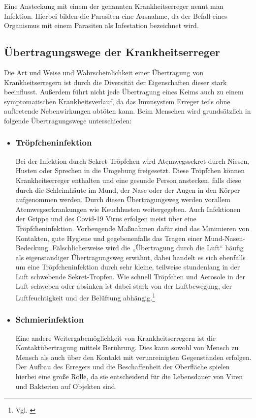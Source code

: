 \documentclass[12pt]{article}
\begin{document}
Eine Ansteckung mit einem der genannten Krankheitserreger nennt man Infektion. Hierbei bilden die Parasiten eine Ausnahme, da der Befall eines Organismus mit einem Parasiten als Infestation bezeichnet wird.

\subsection{Übertragungswege der Krankheitserreger}
Die Art und Weise und Wahrscheinlichkeit einer Übertragung von Krankheitserregern ist durch die Diversität der Eigenschaften dieser stark beeinflusst. Außerdem führt nicht jede Übertragung eines Keims auch zu einem symptomatischen Krankheitsverlauf, da das Imunsystem Erreger teils ohne auftretende Nebenwirkungen abtöten kann. Beim Menschen wird grundsätzlich in folgende Übertragungswege unterschieden:
\begin{itemize}
    \item \subsubsection{Tröpfcheninfektion}
    Bei der Infektion durch Sekret-Tröpfchen wird Atemwegssekret durch Niesen, Husten oder Sprechen in die Umgebung freigesetzt. Diese Tröpfchen können Krankheitserreger enthalten und eine gesunde Person anstecken, falls diese durch die Schleimhäute im  Mund, der Nase oder der Augen in den Körper aufgenommen werden. Durch diesen Übertragungsweg werden vorallem Atemwegserkrankungen wie Keuchhusten weitergegeben. Auch Infektionen der Grippe und des Covid-19 Virus erfolgen meist über eine Tröpfcheninfektion. Vorbeugende Maßnahmen dafür sind das Minimieren von Kontakten, gute Hygiene und gegebenenfalls das Tragen einer Mund-Nasen-Bedeckung.
    Fälschlicherweise wird die „Übertragung durch die Luft“ häufig als eigenständiger Übertragungsweg erwähnt, dabei handelt es sich ebenfalls um eine Tröpfcheninfektion durch sehr kleine, teilweise stundenlang in der Luft schwebende Sekret-Tropfen. Wie schnell Tröpfchen und Aerosole in der Luft schweben oder absinken ist dabei stark von der Luftbewegung, der Luftfeuchtigkeit und der Belüftung abhängig.\footnote{Vgl. \cite{Rki21}}
    \item \subsubsection{Schmierinfektion}
    Eine andere Weitergabemöglichkeit von Krankheitserregern ist die Kontaktübertragung mittels Berührung. Dies kann sowohl von Mensch zu Mensch als auch über den Kontakt mit verunreinigten Gegenständen erfolgen. Der Aufbau des Erregers und die Beschaffenheit der Oberfläche spielen hierbei eine große Rolle, da sie entscheidend für die Lebensdauer von Viren und Bakterien auf Objekten sind.

\end{itemize}
\end{document}
